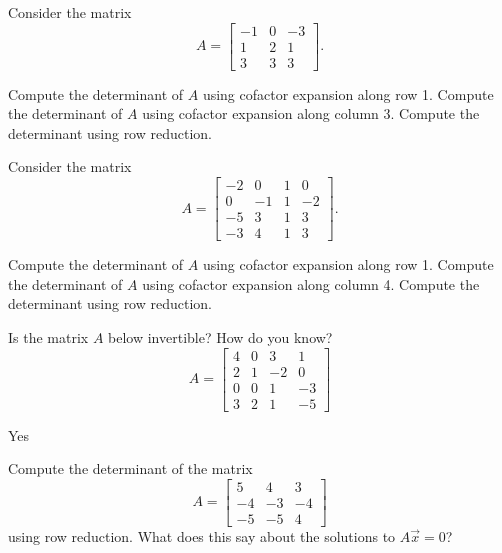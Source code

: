 \begin{exercise}\ansMark%
Consider the matrix
\begin{equation*}
A = \begin{bmatrix}
-1 & 0 & -3 \\ 1 & 2 & 1 \\ 3 & 3 & 3
\end{bmatrix}.
\end{equation*}
\begin{tasks}
\task Compute the determinant of $A$ using cofactor expansion along row 1.
\task Compute the determinant of $A$ using cofactor expansion along column 3.
\task Compute the determinant using row reduction.
\end{tasks}
\end{exercise}
%


\begin{exercise}\ansMark%
Consider the matrix
\begin{equation*}
A = \begin{bmatrix}
-2 & 0 & 1 & 0 \\ 0 & -1 & 1 & -2 \\ -5 &3 & 1 & 3 \\ -3 & 4 & 1 & 3
\end{bmatrix}.
\end{equation*}
\begin{tasks}
\task Compute the determinant of $A$ using cofactor expansion along row 1.
\task Compute the determinant of $A$ using cofactor expansion along column 4.
\task Compute the determinant using row reduction.
\end{tasks}
\end{exercise}
%



\begin{exercise}
Is the matrix $A$ below invertible? How do you know?
\[ A = \begin{bmatrix}4&0&3&1 \\ 2 &1&-2&0 \\ 0&0&1&-3 \\3 & 2 & 1 & -5 \end{bmatrix} \]
\end{exercise}
\comboSol{%
}
{%
Yes
}

\begin{exercise}\ansMark%
Compute the determinant of the matrix
\[ A = \begin{bmatrix}
5 & 4  & 3\\
-4 &-3 &-4\\
-5 &-5 & 4
\end{bmatrix}
\]
using row reduction. What does this say about the solutions to $A\vec{x} = 0$?
\end{exercise}

